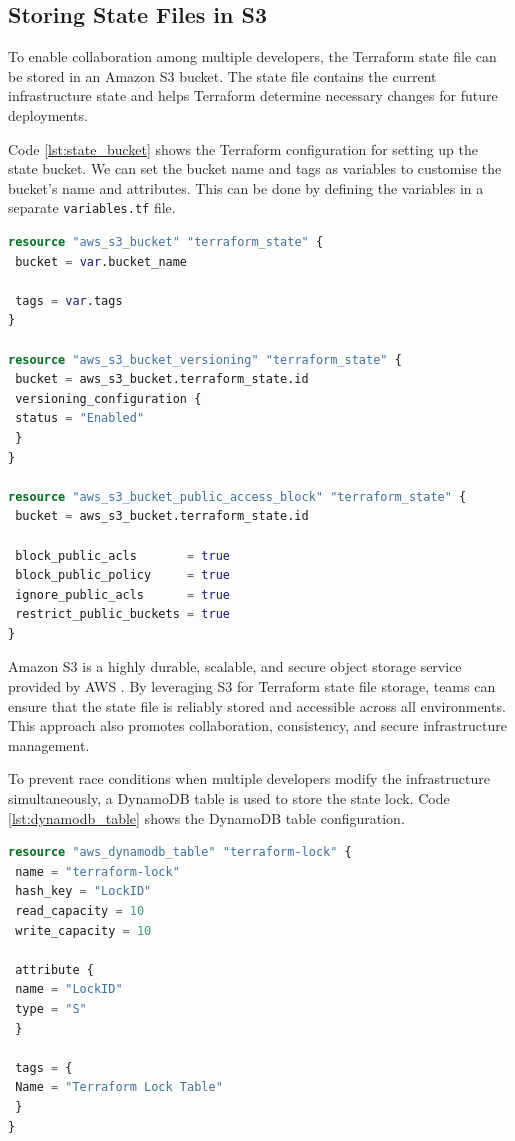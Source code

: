 \subsection{Storing State Files in S3}
To enable collaboration among multiple developers, the Terraform state file can be stored in an Amazon S3 bucket. The state file contains the current infrastructure state and helps Terraform determine necessary changes for future deployments.


Code \ref{lst:state_bucket} shows the Terraform configuration for setting up the state bucket. We can set the bucket name and tags as variables to customise the bucket's name and attributes. This can be done by defining the variables in a separate \texttt{variables.tf} file.

\begin{lstlisting}[language=Terraform, caption={Terraform Configuration for Setting Up State Bucket}, label={lst:state_bucket}]
resource "aws_s3_bucket" "terraform_state" {
 bucket = var.bucket_name

 tags = var.tags
}

resource "aws_s3_bucket_versioning" "terraform_state" {
 bucket = aws_s3_bucket.terraform_state.id
 versioning_configuration {
 status = "Enabled"
 }
}

resource "aws_s3_bucket_public_access_block" "terraform_state" {
 bucket = aws_s3_bucket.terraform_state.id

 block_public_acls       = true
 block_public_policy     = true
 ignore_public_acls      = true
 restrict_public_buckets = true
}
\end{lstlisting}

Amazon S3 is a highly durable, scalable, and secure object storage service provided by AWS \cite{s3}. By leveraging S3 for Terraform state file storage, teams can ensure that the state file is reliably stored and accessible across all environments. This approach also promotes collaboration, consistency, and secure infrastructure management.

To prevent race conditions when multiple developers modify the infrastructure simultaneously, a DynamoDB table \cite{dynamodb} is used to store the state lock. Code \ref{lst:dynamodb_table} shows the DynamoDB table configuration.

\begin{lstlisting}[language=Terraform, caption={Terraform Configuration for Setting Up DynamoDB Table}, label={lst:dynamodb_table}]
resource "aws_dynamodb_table" "terraform-lock" {
 name = "terraform-lock"
 hash_key = "LockID"
 read_capacity = 10
 write_capacity = 10
    
 attribute {
 name = "LockID"
 type = "S"
 }
    
 tags = {
 Name = "Terraform Lock Table"
 }
}
\end{lstlisting}

